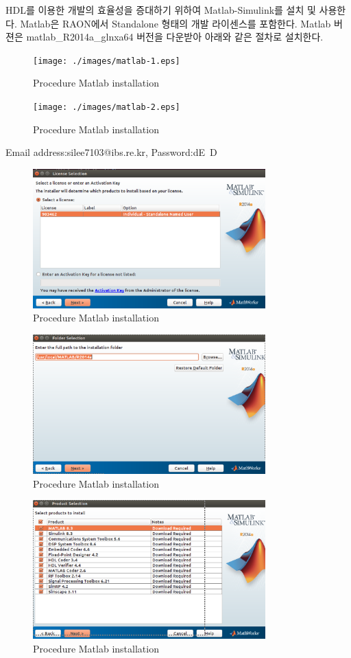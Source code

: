 \documentclass[11pt
  , a4paper
  , article
  , oneside
]{memoir}
\begin{document}
HDL를 이용한 개발의 효율성을 증대하기 위하여 Matlab-Simulink를 설치 및 사용한다. Matlab은 RAON에서 Standalone 형태의 개발 라이센스를 포함한다. Matlab 버젼은 matlab\_R2014a\_glnxa64 버전을 다운받아 아래와 같은 절차로 설치한다.

\begin{figure}[h!]
	\centering
	\texttt{[image: ./images/matlab-1.eps]}
	\caption{Procedure Matlab installation}
	\label{fig:install_1} 
\end{figure}
\begin{figure}[h!]
	\centering
	\texttt{[image: ./images/matlab-2.eps]}
	\caption{Procedure Matlab installation}
	\label{fig:install_2} 
\end{figure}
Email address:silee7103@ibs.re.kr, Password:dE~D
\hfil\break

\begin{figure}[h!]
	\centering
	\includegraphics[width=0.8\textwidth, height=0.4\textwidth]{./images/matlab-3.eps}
	\caption{Procedure Matlab installation}
	\label{fig:install_3} 
\end{figure}	


\begin{figure}[h!]
	\centering
	\includegraphics[width=0.8\textwidth, height=0.4\textwidth]{./images/matlab-4.eps}
	\caption{Procedure Matlab installation}
	\label{fig:install_4} 
\end{figure}	


\begin{figure}[h!]
	\centering
	\includegraphics[width=0.8\textwidth, height=0.4\textwidth]{./images/matlab-5.eps}
	\caption{Procedure Matlab installation}
	\label{fig:install_5} 
\end{figure}	
\end{document}
